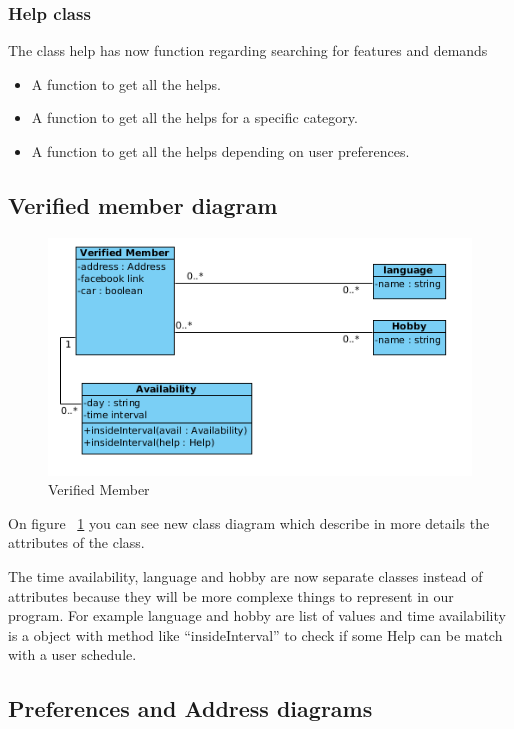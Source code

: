 \documentclass[11pt, a4paper]{article}   	%
\begin{document}
\subsubsection{Help class}

The class help has now function regarding searching for features and demands
\begin{itemize}
\item A function to get all the helps.
\item A function to get all the helps for a specific category.
\item A function to get all the helps depending on user preferences.
\end{itemize}

\subsection{Verified member diagram}

\begin{figure}[!ht]
   \includegraphics[width=\textwidth]{verifiedMember.png}
   \caption{\label{verifiedMember} Verified Member}
\end{figure}

On figure ~\ref{verifiedMember} you can see new class diagram which describe in more details the attributes of the class.

The time availability, language and hobby are now separate classes instead of attributes because they will be more complexe things to represent in our program. For example language and hobby are list of values and time availability is a object with method like \enquote{insideInterval} to check if some Help can be match with a user schedule.

\subsection{Preferences and Address diagrams}
\end{document}
